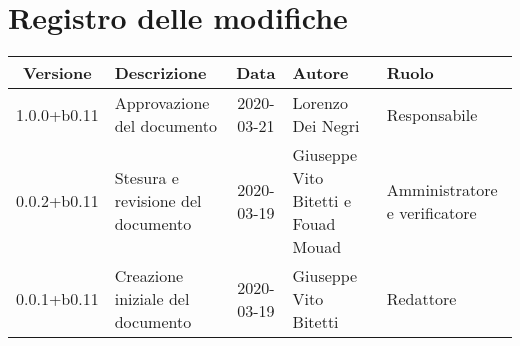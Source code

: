 \section*{Registro delle modifiche}

\begin{center}
	\begin{longtable}{|c|p{3.5cm}|c|p{3cm}|p{3cm}|}
	\hline
	\rowcolor{lighter-grayer}
	\textbf{Versione} & \textbf{Descrizione} & \textbf{Data} & \textbf{Autore} & \textbf{Ruolo} \\
	\hline
	\endfirsthead

	1.0.0+b0.11 & Approvazione del documento & 2020-03-21 & Lorenzo Dei Negri & Responsabile \\
	\hline
	0.0.2+b0.11 & Stesura e revisione del documento & 2020-03-19 & Giuseppe Vito Bitetti e Fouad Mouad & Amministratore e verificatore \\
	\hline
	0.0.1+b0.11 & Creazione iniziale del documento & 2020-03-19 & Giuseppe Vito Bitetti & Redattore \\
	\hline

	\end{longtable}
\end{center}
